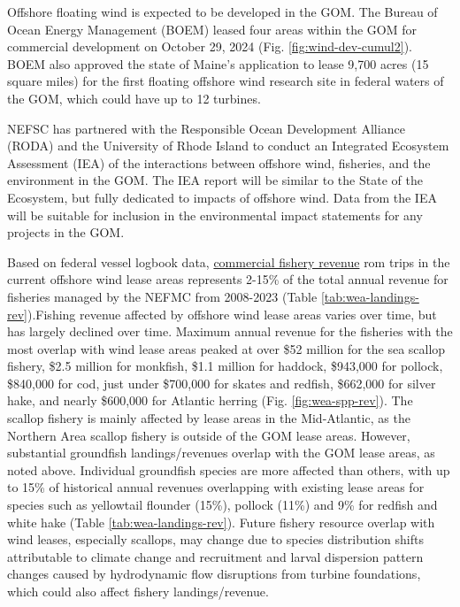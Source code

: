 \documentclass[
  10pt,
]{article}
\begin{document}
Offshore floating wind is expected to be developed in the GOM. The Bureau of Ocean Energy Management (BOEM) leased four areas within the GOM for commercial development on October 29, 2024 (Fig. \ref{fig:wind-dev-cumul2}). BOEM also approved the state of Maine's application to lease 9,700 acres (15 square miles) for the first floating offshore wind research site in federal waters of the GOM, which could have up to 12 turbines.

NEFSC has partnered with the Responsible Ocean Development Alliance (RODA) and the University of Rhode Island to conduct an Integrated Ecosystem Assessment (IEA) of the interactions between offshore wind, fisheries, and the environment in the GOM. The IEA report will be similar to the State of the Ecosystem, but fully dedicated to impacts of offshore wind. Data from the IEA will be suitable for inclusion in the environmental impact statements for any projects in the GOM.

Based on federal vessel logbook data, \href{https://noaa-edab.github.io/catalog/wind_revenue.html}{commercial fishery revenue} rom trips in the current offshore wind lease areas represents 2-15\% of the total annual revenue for fisheries managed by the NEFMC from 2008-2023 (Table \ref{tab:wea-landings-rev}).Fishing revenue affected by offshore wind lease areas varies over time, but has largely declined over time. Maximum annual revenue for the fisheries with the most overlap with wind lease areas peaked at over \$52 million for the sea scallop fishery, \$2.5 million for monkfish, \$1.1 million for haddock, \$943,000 for pollock, \$840,000 for cod, just under \$700,000 for skates and redfish, \$662,000 for silver hake, and nearly \$600,000 for Atlantic herring (Fig. \ref{fig:wea-spp-rev}). The scallop fishery is mainly affected by lease areas in the Mid-Atlantic, as the Northern Area scallop fishery is outside of the GOM lease areas. However, substantial groundfish landings/revenues overlap with the GOM lease areas, as noted above. Individual groundfish species are more affected than others, with up to 15\% of historical annual revenues overlapping with existing lease areas for species such as yellowtail flounder (15\%), pollock (11\%) and 9\% for redfish and white hake (Table \ref{tab:wea-landings-rev}). Future fishery resource overlap with wind leases, especially scallops, may change due to species distribution shifts attributable to climate change and recruitment and larval dispersion pattern changes caused by hydrodynamic flow disruptions from turbine foundations, which could also affect fishery landings/revenue.
\end{document}
